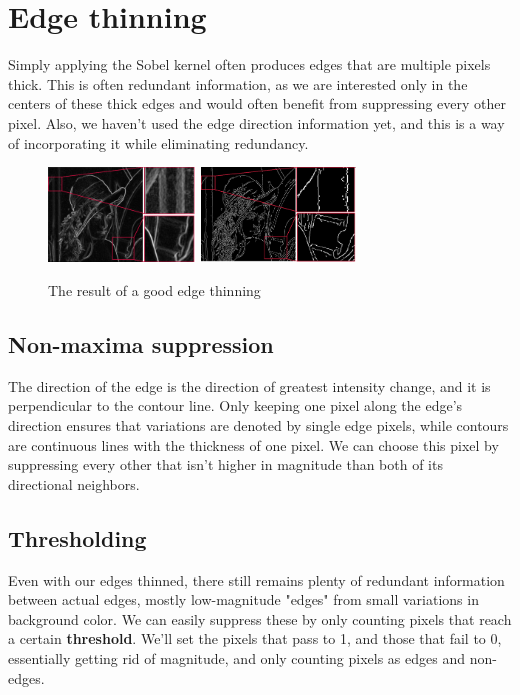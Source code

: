 \documentclass{article}
\begin{document}
\section{Edge thinning}
Simply applying the Sobel kernel often produces edges that are multiple pixels thick. This is often redundant information, as we are interested only in the centers of these thick edges and would often benefit from suppressing every other pixel. Also, we haven't used the edge direction information yet, and this is a way of incorporating it while eliminating redundancy.
\begin{figure}[!htb]
    \begin{center}
        \includegraphics[width=0.35\textwidth]{lena_thick.png}
        \hspace{15pt}
        \includegraphics[width=0.365\textwidth]{lena_thin.png}
    \end{center}
    \vspace{-10pt}
    \caption{The result of a good edge thinning}
\end{figure}
\subsection{Non-maxima suppression}
The direction of the edge is the direction of greatest intensity change, and it is perpendicular to the contour line. Only keeping one pixel along the edge's direction ensures that variations are denoted by single edge pixels, while contours are continuous lines with the thickness of one pixel. We can choose this pixel by suppressing every other that isn't higher in magnitude than both of its directional neighbors.
\subsection{Thresholding}
Even with our edges thinned, there still remains plenty of redundant information between actual edges, mostly low-magnitude "edges" from small variations in background color. We can easily suppress these by only counting pixels that reach a certain \textbf{threshold}. We'll set the pixels that pass to 1, and those that fail to 0, essentially getting rid of magnitude, and only counting pixels as edges and non-edges.
\end{document}
